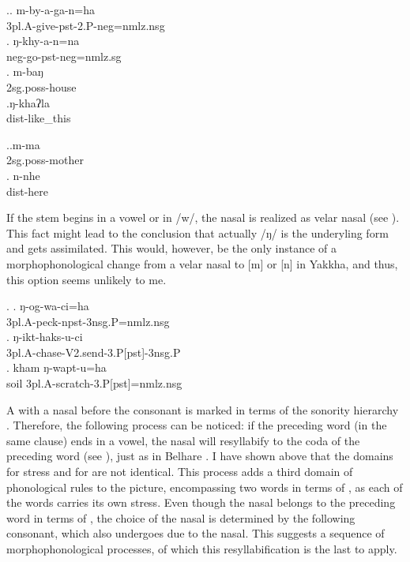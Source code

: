 			
\ex.\ag.	m-by-a-ga-n=ha\\
			{\sc 3pl.A-}give{\sc -pst-2.P-neg=nmlz.nsg}\\
			\bg. ŋ-khy-a-n=na\\
			{\sc neg-}go{\sc [3sg]-pst-neg=nmlz.sg}\\
			\bg.	m-baŋ\\
			{\sc 2sg.poss-}house\\
			\bg.ŋ-khaʔla\\
			{\sc dist-}like\_this\\
			
			
			\ex.\ag.m-ma\\
			{\sc 2sg.poss-}mother\\
			\bg. n-nhe\\
			{\sc dist-}here\\

			
If the stem begins in a vowel or in /w/, the nasal is realized as velar nasal (see \Next). This fact might lead to the conclusion that actually /ŋ/ is the underyling form and gets assimilated. This would, however, be the only instance of a morphophonological change from a velar nasal to [m] or [n] in Yakkha, and thus, this option seems unlikely to me.


\ex. \ag. ŋ-og-wa-ci=ha\\
			{\sc 3pl.A-}peck{\sc -npst-3nsg.P=nmlz.nsg}\\
	\bg. ŋ-ikt-haks-u-ci\\
			{\sc 3pl.A-}chase{\sc -V2.send-3.P[pst]-3nsg.P}\\
	\bg. kham ŋ-wapt-u=ha\\
			soil  {\sc 3pl.A-}scratch{\sc -3.P[pst]=nmlz.nsg}\\


A  with a nasal before the consonant is marked in terms of the sonority hierarchy \citep{Jespersen1904_Lehrbuch, Selkirk1984_SyllableTheory, Hall2000Phonologie}. Therefore, the following  process can be noticed: if the preceding word (in the same clause) ends in a vowel, the nasal will resyllabify to the coda of the preceding word (see \Next), just as in Belhare \citep[547]{Bickel2003Belhare}. I have shown above that the domains for stress and for  are not identical. This process adds a third domain of phonological rules to the picture, encompassing two words in terms of , as each of the words carries its own stress. Even though the nasal belongs to the preceding word in terms of , the choice of the nasal is determined by the following consonant, which also undergoes  due to the nasal. This suggests a sequence of morphophonological processes, of which this resyllabification is the last to apply.    


